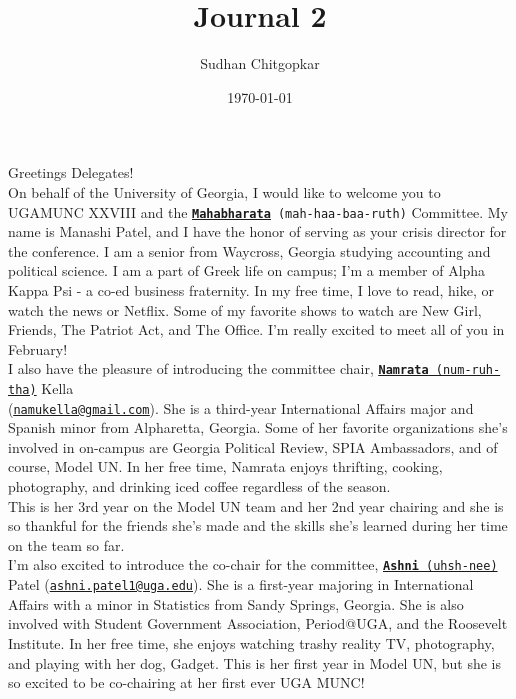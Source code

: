 \documentclass[10pt, letterpaper]{article}
\title{Journal 2}
\author{Sudhan Chitgopkar}
\date{\today}
\begin{document}
Greetings Delegates! \\

On behalf of the University of Georgia, I would like to welcome you to
UGAMUNC XXVIII and the
\texttt{\underline{\href{https://drive.google.com/file/d/12-b_zmhinbKkOyAVeJg0iiA7b07jg8uN/view?usp=sharing}{\textbf{Mahabharata}}}
(mah-haa-baa-ruth)} Committee. My name is Manashi Patel, and I have the
honor of serving as your crisis director for the conference. I am a
senior from Waycross, Georgia studying accounting and political science.
I am a part of Greek life on campus; I'm a member of Alpha Kappa Psi - a
co-ed business fraternity. In my free time, I love to read, hike, or
watch the news or Netflix. Some of my favorite shows to watch are New
Girl, Friends, The Patriot Act, and The Office. I'm really excited to
meet all of you in February! \\

I also have the pleasure of introducing the committee chair,
\texttt{\underline{\href{https://drive.google.com/file/d/1_S9ve7zhbbZEV1lCzaMhAx-Lk6sWg8dz/view?usp=sharing}{\textbf{Namrata}}
(num-ruh-tha)}} Kella \\
(\texttt{\href{mailto:namukella@gmail.com}{\underline{namukella@gmail.com}}}).
She is a third-year International Affairs major and Spanish minor from
Alpharetta, Georgia. Some of her favorite organizations she's involved
in on-campus are Georgia Political Review, SPIA Ambassadors, and of
course, Model UN. In her free time, Namrata enjoys thrifting, cooking,
photography, and drinking iced coffee regardless of the season. \\

This is her 3rd year on the Model UN team and her 2nd year chairing and
she is so thankful for the friends she's made and the skills she's
learned during her time on the team so far. \\

I'm also excited to introduce the co-chair for the committee,
\texttt{\underline{\href{https://drive.google.com/file/d/15s-ZAYrA7ZARL66gJE8hjQ4EltP_k3Q9/view?usp=sharing}{\textbf{Ashni}}
(uhsh-nee)}} Patel
(\texttt{\href{mailto:ashni.patel1@uga.edu}{\underline{ashni.patel1@uga.edu}}}).
She is a first-year majoring in International Affairs with a minor in
Statistics from Sandy Springs, Georgia. She is also involved with
Student Government Association, Period@UGA, and the Roosevelt Institute.
In her free time, she enjoys watching trashy reality TV, photography,
and playing with her dog, Gadget. This is her first year in Model UN,
but she is so excited to be co-chairing at her first ever UGA MUNC! \\
\end{document}
